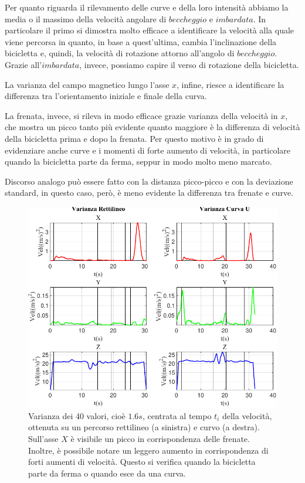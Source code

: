 \documentclass[class=article]{standalone}
\begin{document}
	Per quanto riguarda il rilevamento delle curve e della loro intensità abbiamo la media o il massimo della velocità angolare di \(beccheggio\) e \(imbardata\). In particolare il primo si dimostra molto efficace a identificare la velocità alla quale viene percorsa in quanto, in base a quest'ultima, cambia l'inclinazione della bicicletta e, quindi, la velocità di rotazione attorno all'angolo di \(beccheggio\). Grazie all'\(imbardata\), invece, possiamo capire il verso di rotazione della bicicletta.
	
	La varianza del campo magnetico lungo l'asse \(x\), infine, riesce a identificare la differenza tra l'orientamento iniziale e finale della curva.\hfill\break
	
	La frenata, invece, si rileva in modo efficace grazie varianza della velocità in \(x\), che mostra un picco tanto più evidente quanto maggiore è la differenza di velocità della bicicletta prima e dopo la frenata. Per questo motivo è in grado di evidenziare anche curve e i momenti di forte aumento di velocità, in particolare quando la bicicletta parte da ferma, seppur in modo molto meno marcato.
	
	Discorso analogo può essere fatto con la distanza picco-picco e con la deviazione standard, in questo caso, però, è meno evidente la differenza tra frenate e curve.
	
	\begin{center}
		\begin{figure}[h!]
			\centering\includegraphics[width=.7\textwidth]{img/LungaCurvaU/Vel/Varianza}
			\caption[]{Varianza dei 40 valori, cioè \(1.6s\), centrata al tempo \(t_{i}\) della velocità, ottenuta su un percorso rettilineo (a sinistra) e curvo (a destra). Sull'asse \(X\) è visibile un picco in corrispondenza delle frenate. Inoltre, è possibile notare un leggero aumento in corrispondenza di forti aumenti di velocità. Questo si verifica quando la bicicletta parte da ferma o quando esce da una curva.}
			\label{fig:VelVar_LungaCurvaU}
		\end{figure}
	\end{center}
	
\end{document}
